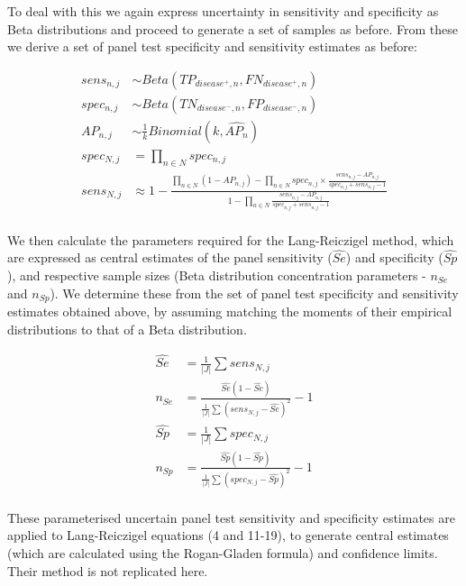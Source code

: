 \documentclass[a4paper, 12pt, twoside]{article}
\begin{document}
To deal with this we again express uncertainty in sensitivity and specificity as Beta distributions and proceed to generate a set of samples as before. From these we derive a set of panel test specificity and sensitivity estimates as before:

\begin{equation*}
\begin{aligned}
sens_{n,j} &\sim Beta(TP_{disease^+,n}, FN_{disease^+,n}) \\
spec_{n,j} &\sim Beta(TN_{disease^-,n}, FP_{disease^-,n}) \\
AP_{n,j} &\sim \frac{1}{k}Binomial(k, \widehat{AP_n}) \\
spec_{N,j} &= \prod_{n \in N}{spec_{n,j}} \\
sens_{N,j} &\approx 1-\frac{
  \prod_{n \in N}{(1-AP_{n,j})} - \prod_{n \in N}{spec_{n,j} \times \frac{sens_{n,j}-AP_{n,j}}{spec_{n,j} + sens_{n,j} - 1}}
}{
  1 - \prod_{n \in N}{ \frac{sens_{n,j}-AP_{n,j}}{spec_{n,j} + sens_{n,j} - 1} }
} \\
\end{aligned}
\end{equation*}

We then calculate the parameters required for the Lang-Reiczigel method\cite{lang2014}, which are expressed as central estimates of the panel sensitivity (\(\widehat{Se}\)) and specificity (\(\widehat{Sp}\)), and respective sample sizes (Beta distribution concentration parameters - \(n_{Se}\) and \(n_{Sp}\)). We determine these from the set of panel test specificity and sensitivity estimates obtained above, by assuming matching the moments of their empirical distributions to that of a Beta distribution.

\begin{equation*}
\begin{aligned}
\widehat{Se} &= \frac{1}{|J|}\sum{sens_{N,j}}\\
n_{Se} &= \frac{
\widehat{Se}(1-\widehat{Se})
}{
\frac{1}{|J|}\sum{(sens_{N,j}-\widehat{Se})^2}
}-1\\
\widehat{Sp} &= \frac{1}{|J|}\sum{spec_{N,j}}\\
n_{Sp} &= \frac{
\widehat{Sp}(1-\widehat{Sp})
}{
\frac{1}{|J|}\sum{(spec_{N,j}-\widehat{Sp})^2}
}-1\\
\end{aligned}
\end{equation*}

These parameterised uncertain panel test sensitivity and specificity estimates are applied to Lang-Reiczigel equations (4 and 11-19)\cite{lang2014}, to generate central estimates (which are calculated using the Rogan-Gladen formula) and confidence limits. Their method is not replicated here.
\end{document}
